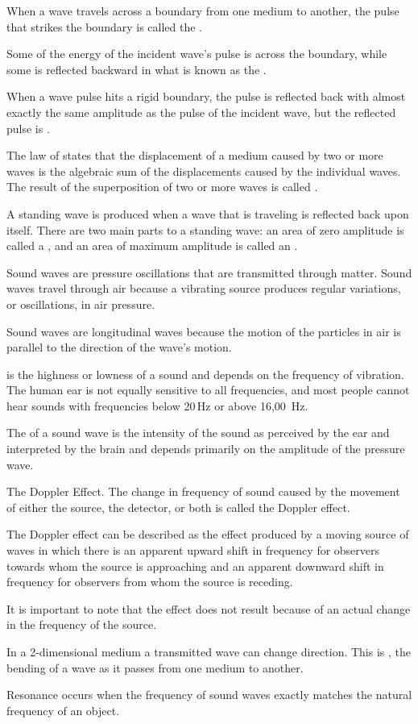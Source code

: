 \documentclass[]{exam}
\begin{document}
\doublespacing
\begin{questions}
\question
When a wave travels across a boundary from one medium to another, the pulse that strikes the boundary is called the .

\question
Some of the energy of the incident wave’s pulse is \fillin[transmitted][4cm] across the boundary, while some is reflected backward in what is known as the .

\question
When a wave pulse hits a rigid boundary, the pulse is reflected back with almost exactly the same amplitude as the pulse of the incident wave, but the reflected pulse is \fillin[inverted].

\question
The law of \fillin[superposition][4cm] states that the displacement of a medium caused by two or more waves is the algebraic sum of the displacements caused by the individual waves. The result of the superposition of two or more waves is called \fillin[interference][4cm].

\question
A standing wave is produced when a wave that is traveling is reflected back upon itself. There are two main parts to a standing wave: an area of zero amplitude is called a \fillin[node], and an area of maximum amplitude is called an \fillin[antinode].

\question
Sound waves are pressure oscillations that are transmitted through matter. Sound waves travel through air because a vibrating source produces regular variations, or oscillations, in air pressure.

\question
Sound waves are longitudinal waves because the motion of the particles in air is parallel to the direction of the wave’s motion.

\question
\fillin[Pitch] is the highness or lowness of a sound and depends on the frequency of vibration. The human ear is not equally sensitive to all frequencies, and most people cannot hear sounds with frequencies below 20\,Hz or above 16,00\, Hz.

\question
The \fillin[loudness] of a sound wave is the intensity of the sound as perceived by the ear and interpreted by the brain and depends primarily on the amplitude of the pressure wave.

\question
The Doppler Effect. The change in frequency of sound caused by the movement of either the source, the detector, or both is called the Doppler effect.

The Doppler effect can be described as the effect produced by a moving source of waves in which there is an apparent upward shift in frequency for observers towards whom the source is approaching and an apparent downward shift in frequency for observers from whom the source is receding.

It is important to note that the effect does not result because of an actual change in the frequency of the source.

\question
In a 2-dimensional medium a transmitted wave can change direction. This is \fillin[refraction], the bending of a wave as it passes from one medium to another. 

\question
Resonance occurs when the frequency of sound waves exactly matches the natural frequency of an object. 
\end{questions}
\end{document}
